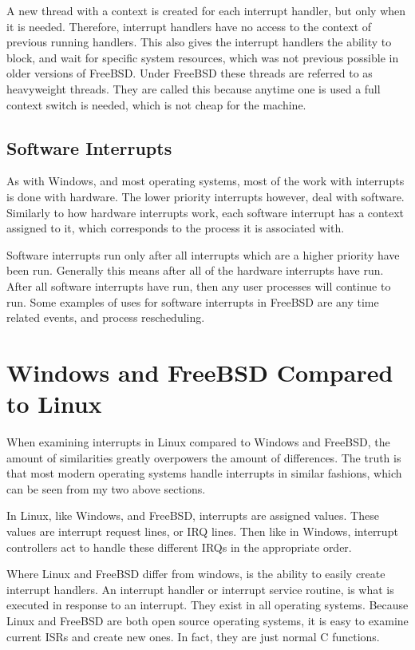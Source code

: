 \documentclass[letterpaper,10pt,titlepage,draftclsnofoot,onecolumn]{IEEEtran}
\begin{document}
A new thread with a context is created for each interrupt handler, but only when it is needed. Therefore, interrupt handlers have no access to the context of previous running handlers. This also gives the interrupt handlers the ability to block, and wait for specific system resources, which was not previous possible in older versions of FreeBSD. \cite{freebsd} Under FreeBSD these threads are referred to as heavyweight threads. They are called this because anytime one is used a full context switch is needed, which is not cheap for the machine.  

\subsection{Software Interrupts}
As with Windows, and most operating systems, most of the work with interrupts is done with hardware. The lower priority interrupts however, deal with software. Similarly to how hardware interrupts work, each software interrupt has a context assigned to it, which corresponds to the process it is associated with. 

Software interrupts run only after all interrupts which are a higher priority have been run. Generally this means after all of the hardware interrupts have run. After all software interrupts have run, then any user processes will continue to run. Some examples of uses for software interrupts in FreeBSD are any time related events, and process rescheduling. \cite{freebsd}

\section{Windows and FreeBSD Compared to Linux}
When examining interrupts in Linux compared to Windows and FreeBSD, the amount of similarities greatly overpowers the amount of differences. The truth is that most modern operating systems handle interrupts in similar fashions, which can be seen from my two above sections.

In Linux, like Windows, and FreeBSD, interrupts are assigned values. These values are interrupt request lines, or IRQ lines. Then like in Windows, interrupt controllers act to handle these different IRQs in the appropriate order.

Where Linux and FreeBSD differ from windows, is the ability to easily create interrupt handlers. An interrupt handler or interrupt service routine, is what is executed in response to an interrupt. They exist in all operating systems. Because Linux and FreeBSD are both open source operating systems, it is easy to examine current ISRs and create new ones. In fact, they are just normal C functions. \cite{linux}
\end{document}
